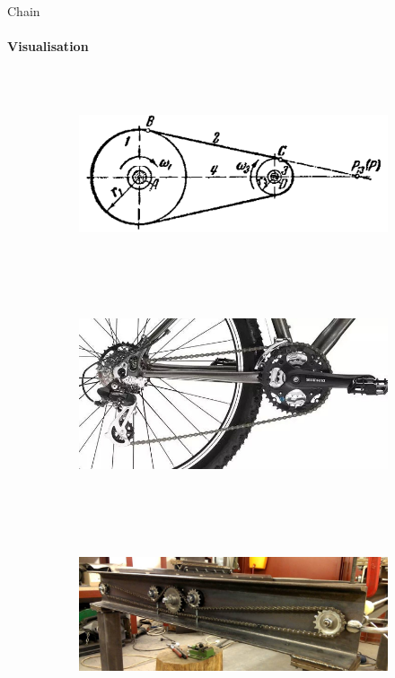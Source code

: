 \documentclass[aspectratio=169]{beamer}
\begin{document}
\begin{frame}[t]{Chain}
    \framesubtitle{Visualisation}
    \vspace{-1cm}
    \begin{figure}[H]
        \begin{subfigure}[c]{0.49\textwidth}
            \centering\includegraphics[height=6cm,width=1\textwidth,keepaspectratio]{belt_kinematics_1.png}
        \end{subfigure}
        \begin{subfigure}[c]{0.49\textwidth}
            \centering\includegraphics[height=6cm,width=1\textwidth,keepaspectratio]{chain_1.jpg}
            \label{fig:chain_1.jpg}
        \end{subfigure}

        \begin{subfigure}[c]{0.5\textwidth}
            \centering\includegraphics[height=6cm,width=1\textwidth,keepaspectratio]{chain_2.jpg}
            \label{fig:chain_2.jpg}
        \end{subfigure}
    \end{figure}
\end{frame}
\end{document}
